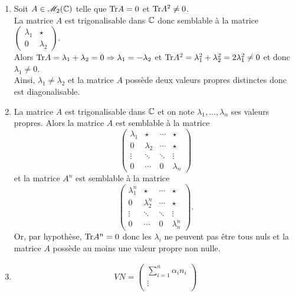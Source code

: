 \begin{solution}
    \begin{enumerate}
        \item Soit $A \in \mathscr{M}_2(\mathbb{C})$ telle que $\mathrm{Tr}{A} = 0$ et $\mathrm{Tr}{A^2} \not=0$. \\
        La matrice $A$ est trigonalisable dans $\mathbb{C}$ donc semblable à la matrice $\begin{pmatrix} \lambda_1 & \star \\ 0 & \lambda_2 \end{pmatrix}$. \\
        Alors $\mathrm{Tr}{A} = \lambda_1 + \lambda_2 = 0 \Rightarrow \lambda_1 = - \lambda_2$ et $\mathrm{Tr}{A^2} = \lambda_1^2 + \lambda_2^2 = 2 \lambda_1^2 \not=0$ et donc $\lambda_1 \not=0$. \\
        Ainsi, $\lambda_1 \not= \lambda_2$ et la matrice $A$ possède deux valeurs propres distinctes donc est diagonalisable. 
        \item La matrice $A$ est trigonalisable dans $\mathbb{C}$ et on note $\lambda_1, \dots, \lambda_n$ ses valeurs propres. Alors la matrice $A$ est semblable à la matrice 
        $$
        \begin{pmatrix}
            \lambda_1 & \star & \cdots & \star \\
            0 & \lambda_2 & \cdots & \star \\
            \vdots & \ddots &\ddots & \vdots \\
            0 & \cdots & 0 & \lambda_n
        \end{pmatrix}
        $$
        et la matrice $A^n$ est semblable à la matrice
        $$
        \begin{pmatrix}
            \lambda_1^n & \star & \cdots & \star \\
            0 & \lambda_2^n & \cdots & \star \\
            \vdots & \ddots &\ddots & \vdots \\
            0 & \cdots & 0 & \lambda_n^n
        \end{pmatrix}.
        $$
        Or, par hypothèse, $\mathrm{Tr}{A^n} = 0$ donc les $\lambda_i$ ne peuvent pas être tous nuls et la matrice $A$ possède au moins une valeur propre non nulle.
        \item
        \begin{align*}
            V N = 
            \begin{pmatrix}
                \sum\limits_{i=1}^n \alpha_i n_i \\ 
                \vdots \\ 

\end{pmatrix}
\end{align*}
\end{enumerate}
\end{solution}
